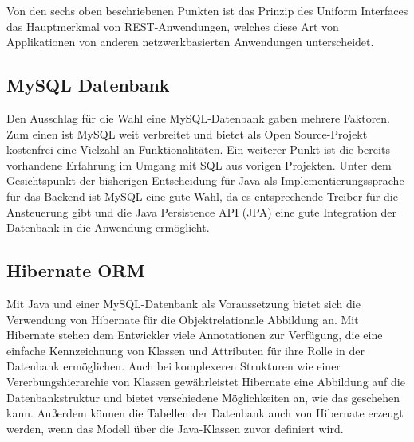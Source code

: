 Von den sechs oben beschriebenen Punkten ist das Prinzip des Uniform Interfaces das Hauptmerkmal von REST-Anwendungen, welches diese Art von Applikationen von anderen netzwerkbasierten Anwendungen unterscheidet.

\subsection{MySQL Datenbank}
Den Ausschlag für die Wahl eine MySQL-Datenbank gaben mehrere Faktoren. Zum einen ist MySQL weit verbreitet und bietet als Open Source-Projekt kostenfrei eine Vielzahl an Funktionalitäten.
Ein weiterer Punkt ist die bereits vorhandene Erfahrung im Umgang mit SQL aus vorigen Projekten.
Unter dem Gesichtspunkt der bisherigen Entscheidung für Java als Implementierungssprache für das Backend ist MySQL eine gute Wahl, da es entsprechende Treiber für die Ansteuerung gibt und die Java Persistence API (\acs{JPA}) eine gute Integration der Datenbank in die Anwendung ermöglicht.

\subsection{Hibernate ORM}
Mit Java und einer MySQL-Datenbank als Voraussetzung bietet sich die Verwendung von Hibernate für die Objektrelationale Abbildung an.
Mit Hibernate stehen dem Entwickler viele Annotationen zur Verfügung, die eine einfache Kennzeichnung von Klassen und Attributen für ihre Rolle in der Datenbank ermöglichen.
Auch bei komplexeren Strukturen wie einer Vererbungshierarchie von Klassen gewährleistet Hibernate eine Abbildung auf die Datenbankstruktur und bietet verschiedene Möglichkeiten an, wie das geschehen kann.
Außerdem können die Tabellen der Datenbank auch von Hibernate erzeugt werden, wenn das Modell über die Java-Klassen zuvor definiert wird.
